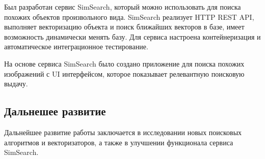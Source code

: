 \documentclass[a4paper,12pt]{extarticle}
\begin{document}
Был разработан сервис SimSearch, который можно использовать для поиска похожих объектов произвольного вида. SimSearch реализует HTTP REST API, выполняет векторизацию объекта и поиск ближайших векторов в базе, имеет возможность динамически менять базу. Для сервиса настроена контейнеризация и автоматическое интеграционное тестирование.

На основе сервиса SimSearch было создано приложение для поиска похожих изображений с UI интерфейсом, которое показывает релевантную поисковую выдачу.


\subsection{Дальнешее развитие}

Дальнейшее развитие работы заключается в исследовании новых поисковых алгоритмов и векторизаторов, а также в улучшении функционала сервиса SimSearch.




	
	
\end{document}
